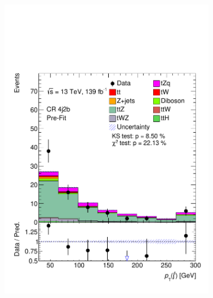 \begin{figure}[!h]
\begin{subfigure}[b]{0.33\linewidth}
    \includegraphics[width=\linewidth]{ubonn-thesis/Chapters/Chapters_06/Figure/Input_distribution/CR_4j2b_forwardjet_pt.pdf} 
  \end{subfigure}%
  \begin{subfigure}[b]{0.33\linewidth}
    \centering

\end{subfigure}
\end{figure}
